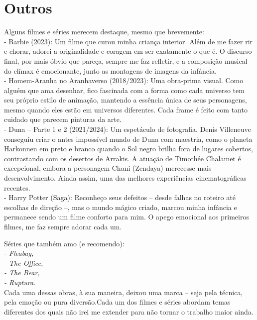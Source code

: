 \documentclass[
    12pt,                  %
    openright,             %
    oneside,               %
    a4paper,               %
    chapter=TITLE,         %
    section=TITLE,         %
    brazil                 %
]{abntex2}                 %
\begin{document}
\chapter*{Outros}
Alguns filmes e séries merecem destaque, mesmo que brevemente:\\
\vspace{16px}
- Barbie (2023): Um filme que curou minha criança interior. Além de me fazer rir e chorar, adorei a originalidade e coragem em ser exatamente o que é. O discurso final, por mais óbvio que pareça, sempre me faz refletir, e a composição musical do clímax é emocionante, junto as montagens de imagens da infância. \\
\vspace{12px}
- Homem-Aranha no Aranhaverso (2018/2023): Uma obra-prima visual. Como alguém que ama desenhar, fico fascinada com a forma como cada universo tem seu próprio estilo de animação, mantendo a essência única de seus personagens, mesmo quando eles estão em universos diferentes. Cada frame é feito com tanto cuidado que parecem pinturas da arte.\\
\vspace{12px}
- Duna – Parte 1 e 2 (2021/2024): Um espetáculo de fotografia. Denis Villeneuve conseguiu criar o antes impossível mundo de Duna com maestria, como o planeta Harkonnen em preto e branco quando o Sol negro brilha fora de lugares cobertos, contrastando com os desertos de Arrakis. A atuação de Timothée Chalamet é excepcional, embora a personagem Chani (Zendaya) merecesse mais desenvolvimento. Ainda assim, uma das melhores experiências cinematográficas recentes.\\
\vspace{12px}
- Harry Potter (Saga): Reconheço seus defeitos – desde falhas no roteiro até escolhas de direção –, mas o mundo mágico criado, marcou minha infância e permanece sendo um filme conforto para mim. O apego emocional aos primeiros filmes, me faz sempre adorar cada um.

Séries que também amo (e recomendo):\\
\textit{- Fleabag,\\
- The Office,\\
- The Bear,\\
- Ruptura.\\}
\vspace{12px}
Cada uma dessas obras, à sua maneira, deixou uma marca – seja pela técnica, pela emoção ou pura diversão.Cada um dos filmes e séries abordam temas diferentes dos 
quais não irei me extender para não tornar o trabalho maior ainda. \\
\end{document}
